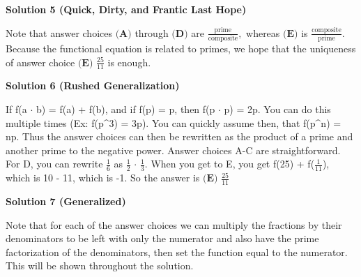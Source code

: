 \begin{enumerate}
\textbf{Solution 5 (Quick, Dirty, and Frantic Last Hope)}

Note that answer choices $\textbf{(A)}$ through $\textbf{(D)}$ are $\frac{\text{prime}}{\text{composite}},$ whereas $\textbf{(E)}$ is $\frac{\text{composite}}{\text{prime}}.$ Because the functional equation is related to primes, we hope that the uniqueness of answer choice $\boxed{\textbf{(E) }\frac{25}{11}}$ is enough.

 



\textbf{Solution 6 (Rushed Generalization)}

If f(a $\cdot$ b) = f(a) + f(b), and if f(p) = p, then f(p $\cdot$ p) = 2p. You can do this multiple times (Ex: f(p\textasciicircum{}3) = 3p). You can quickly assume then, that f(p\textasciicircum{}n) = np. Thus the answer choices can then be rewritten as the product of a prime and another prime to the negative power. Answer choices A-C are straightforward. For D, you can rewrite $\frac{1}{6}$ as $\frac{1}{2}$ $\cdot$ $\frac{1}{3}$. When you get to E, you get f(25) + f($\frac{1}{11}$), which is 10 - 11, which is -1. So the answer is $\boxed{\textbf{(E) }\frac{25}{11}}$




\textbf{Solution 7 (Generalized)}

Note that for each of the answer choices we can multiply the fractions by their denominators to be left with only the numerator and also have the prime factorization of the denominators, then set the function equal to the numerator. This will be shown throughout the solution.


\end{enumerate}
